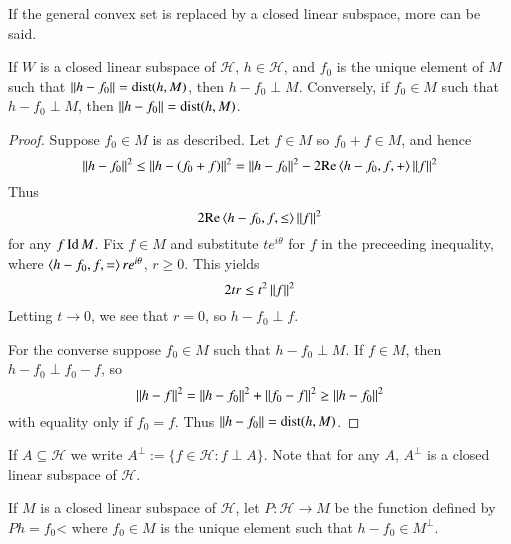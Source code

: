 If the general convex set is replaced by a closed linear subspace, more can be said.

\begin{thm}
    If $W$ is a closed linear subspace of $\mathscr{H}$, $h \in \mathscr{H}$, and $f_0$ is the unique element of $M$ such that $\left|\left| h-f_0\right|\right| = \text{dist}(h,M)$, then $h-f_0\perp M$. Conversely, if $f_0 \in M$ such that $h-f_0 \perp M$, then $\left|\left| h-f_0\right|\right| = \text{dist}(h,M)$.
\end{thm}
\begin{proof}
    Suppose $f_0 \in M$ is as described. Let $f \in M$ so $f_0+f \in M$, and hence $$\left|\left| h-f_0\right|\right|^2 \leq \left|\left| h-(f_0+f)\right|\right|^2 = \left|\left| h-f_0\right|\right|^2-2\text{Re}\left\langle h-f_0,f, +\right\rangle\left|\left| f\right|\right|^2$$
    Thus $$2\text{Re}\left\langle h-f_0,f, \leq\right\rangle \left|\left| f\right|\right|^2$$
    for any $f \operatorname{Id} M$. Fix $f \in M$ and substitute $te^{i\theta}$ for $f$ in the preceeding inequality, where $\left\langle h-f_0,f, =\right\rangle re^{i\theta}$, $r \geq 0$. This yields $$2tr \leq t^2\left|\left| f\right|\right|^2$$
    Letting $t\rightarrow 0$, we see that $r = 0$, so $h-f_0 \perp f$.


    For the converse suppose $f_0 \in M$ such that $h-f_0 \perp M$. If $f \in M$, then $h-f_0 \perp f_0-f$, so $$\left|\left| h-f\right|\right|^2 = \left|\left| h-f_0\right|\right|^2 +\left|\left| f_0-f\right|\right|^2 \geq \left|\left| h-f_0\right|\right|^2$$
    with equality only if $f_0 = f$. Thus $\left|\left| h-f_0\right|\right| = \text{dist}(h,M)$.
\end{proof}

If $A \subseteq \mathscr{H}$ we write $A^{\perp} := \{f \in \mathscr{H}:f\perp A\}$. Note that for any $A$, $A^{\perp}$ is a closed linear subspace of $\mathscr{H}$.

If $M$ is a closed linear subspace of $\mathscr{H}$, let $P:\mathscr{H}\rightarrow M$ be the function defined by $Ph = f_0$< where $f_0 \in M$ is the unique element such that $h-f_0 \in M^{\perp}$.

